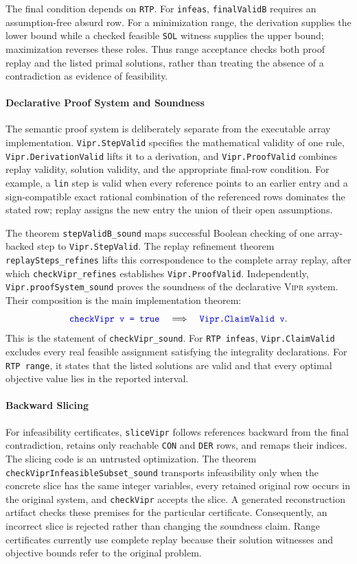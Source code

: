 \documentclass{article}
\newcommand{\code}[1]{\textcolor{blue!70!black}{\texttt{#1}}}
\newcommand{\vipr}{\textsc{Vipr}}
\begin{document}
The final condition depends on \code{RTP}. For \code{infeas},
\code{finalValidB} requires an assumption-free absurd row. For a minimization
range, the derivation supplies the lower bound while a checked feasible
\code{SOL} witness supplies the upper bound; maximization reverses these roles.
Thus range acceptance checks both proof replay and the listed primal
solutions, rather than treating the absence of a contradiction as evidence of
feasibility.

\paragraph{Declarative Proof System and Soundness}

The semantic proof system is deliberately separate from the executable array
implementation. \code{Vipr.StepValid} specifies the mathematical validity of
one rule, \code{Vipr.DerivationValid} lifts it to a derivation, and
\code{Vipr.ProofValid} combines replay validity, solution validity, and
the appropriate final-row condition.
For example, a \code{lin} step is valid when every reference points to an
earlier entry and a sign-compatible exact rational combination of the
referenced rows dominates the stated row; replay assigns the new entry the
union of their open assumptions.

The theorem \code{stepValidB\_sound} maps successful Boolean checking of one
array-backed step to \code{Vipr.StepValid}. The replay refinement theorem
\code{replaySteps\_refines} lifts this correspondence to the complete
array replay, after which
\code{checkVipr\_refines} establishes
\code{Vipr.ProofValid}. Independently,
\code{Vipr.proofSystem\_sound} proves the soundness of the declarative
\vipr{} system. Their composition is the main implementation theorem:
\[
  \code{checkVipr v = true}
  \quad\Longrightarrow\quad
  \code{Vipr.ClaimValid v}.
\]
This is the statement of \code{checkVipr\_sound}. For
\code{RTP infeas}, \code{Vipr.ClaimValid} excludes every real feasible
assignment satisfying the integrality declarations. For \code{RTP range}, it
states that the listed solutions are valid and that every optimal objective
value lies in the reported interval.

\paragraph{Backward Slicing}

For infeasibility certificates, \code{sliceVipr} follows references backward
from the final contradiction, retains only reachable \code{CON} and
\code{DER} rows, and remaps their indices. The slicing code is an untrusted
optimization. The theorem \code{checkViprInfeasibleSubset\_sound} transports
infeasibility only when the concrete slice has the same integer variables,
every retained original row occurs in the original system, and
\code{checkVipr} accepts the slice. A generated reconstruction artifact
checks these premises for the particular certificate. Consequently, an
incorrect slice is rejected rather than changing the soundness claim. Range
certificates currently use complete replay because their solution witnesses
and objective bounds refer to the original problem.
\end{document}
